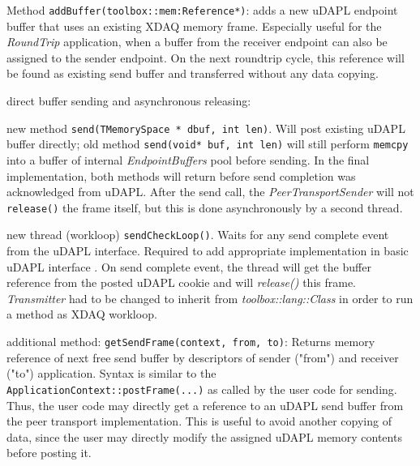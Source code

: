 \begin{description}
\begin{compactitem}[$\bullet$]
\item Method {\tt addBuffer(toolbox::mem:Reference*)}: adds
a new uDAPL endpoint buffer that uses an existing XDAQ memory frame.
Especially useful for
the {\em RoundTrip} application, when a buffer from the receiver endpoint 
can also be assigned to the sender endpoint.  
On the next roundtrip cycle, this reference will be found as
existing send buffer and transferred 
without any data copying.

\end{compactitem}
\medskip

\item [ptdapl::Transmitter:] direct buffer sending and 
asynchronous releasing:
\begin{compactitem}[$\bullet$]

\item new  method {\tt send(TMemorySpace * dbuf, int len)}.
Will post existing uDAPL buffer directly; old method 
{\tt send(void* buf, int len)} will still perform {\tt memcpy} into a 
buffer of  internal {\em EndpointBuffers} pool before sending.
In the final implementation, both methods will return before 
send completion was acknowledged from uDAPL. After the send call, the
{\em PeerTransportSender} will not {\tt release()} the frame itself, 
but this is done asynchronously by a second thread. 

\item new thread (workloop) {\tt sendCheckLoop()}. 
Waits for any send complete event from the uDAPL interface. Required
to add appropriate implementation in 
basic uDAPL interface . 
On send complete event, the thread will get the buffer reference from the
posted uDAPL cookie and will  {\em release()} this frame.
{\em Transmitter} had to be changed to inherit from
{\em toolbox::lang::Class} in order to run a method as XDAQ workloop. 

\end{compactitem}


\item [PeerTransportDAPL:]
\label{ptdaplgetsendframe}
additional method: 
{\tt getSendFrame(context, from, to)}: 
Returns memory reference of next free send buffer by descriptors of sender 
("from") and receiver ("to") application. Syntax is similar to the 
{\tt ApplicationContext::postFrame(...)} as called by the 
user code for sending. Thus, the user code may directly get a
reference to an uDAPL send buffer from the peer transport implementation.
This is useful to avoid another copying of data, since the user may
directly modify the assigned uDAPL memory contents before posting it.


\end{description}
